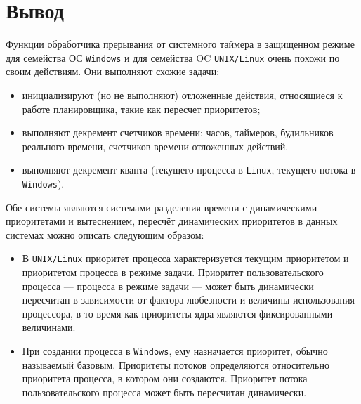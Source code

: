 \chapter*{Вывод}

Функции обработчика прерывания от системного таймера в защищенном режиме для
семейства ОС \texttt{Windows} и для семейства OC \texttt{UNIX/Linux} очень
похожи по своим действиям. Они выполняют схожие задачи:

\begin{itemize}
    \item инициализируют (но не выполняют) отложенные действия, относящиеся к
          работе планировщика, такие как пересчет приоритетов;
    \item выполняют декремент счетчиков времени: часов, таймеров, будильников
          реального времени, счетчиков времени отложенных действий.
    \item выполняют декремент кванта (текущего процесса в \texttt{Linux},
          текущего потока в \texttt{Windows}).
\end{itemize}

Обе системы являются системами разделения времени с динамическими приоритетами
и вытеснением, пересчёт динамических приоритетов в данных системах можно
описать следующим образом:
\begin{itemize}
    \item В \texttt{UNIX/Linux} приоритет процесса характеризуется текущим
          приоритетом и приоритетом процесса в режиме задачи. Приоритет
          пользовательского процесса --- процесса в режиме задачи --- может
          быть динамически пересчитан в зависимости от фактора любезности и
          величины использования процессора, в то время как приоритеты ядра
          являются фиксированными величинами.
    \item При создании процесса в \texttt{Windows}, ему назначается приоритет,
          обычно называемый базовым. Приоритеты потоков определяются
          относительно приоритета процесса, в котором они создаются. Приоритет
          потока пользовательского процесса может быть пересчитан динамически.
\end{itemize}

